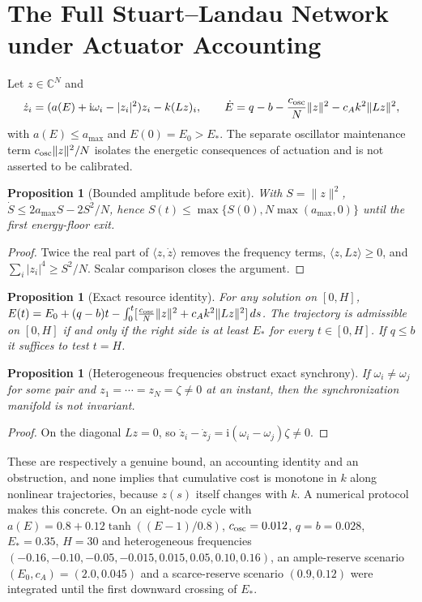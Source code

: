\documentclass[11pt,notitlepage]{report}
\newtheorem{proposition}[theorem]{Proposition}
\theoremstyle{definition}
\theoremstyle{remark}
\newcommand{\C}{\mathbb C}
\newcommand{\ii}{\mathrm i}
\begin{document}
\section{The Full Stuart--Landau Network under Actuator Accounting}
Let $z\in\C^N$ and
\begin{equation}\label{eq:SLact}
\dot z_i=(a(E)+\ii\omega_i-|z_i|^2)z_i-k(Lz)_i,\qquad
\dot E=q-b-\frac{c_{\rm osc}}N\|z\|^2-c_Ak^2\|Lz\|^2,
\end{equation}
with $a(E)\le a_{\max}$ and $E(0)=E_0>E_*$. The separate oscillator maintenance term $c_{\rm osc}\|z\|^2/N$ isolates the energetic consequences of actuation and is not asserted to be calibrated.
\begin{proposition}[Bounded amplitude before exit]\label{prop:bound}
With $S=\|z\|^2$, $\dot S\le2a_{\max}S-2S^2/N$, hence $S(t)\le\max\{S(0),N\max(a_{\max},0)\}$ until the first energy-floor exit.
\end{proposition}
\begin{proof}
Twice the real part of $\langle z,\dot z\rangle$ removes the frequency terms, $\langle z,Lz\rangle\ge0$, and $\sum_i|z_i|^4\ge S^2/N$. Scalar comparison closes the argument.
\end{proof}
\begin{proposition}[Exact resource identity]\label{prop:resource}
For any solution on $[0,H]$,
$E(t)=E_0+(q-b)t-\int_0^t[\tfrac{c_{\rm osc}}N\|z\|^2+c_Ak^2\|Lz\|^2]\,ds$.
The trajectory is admissible on $[0,H]$ if and only if the right side is at least $E_*$ for every $t\in[0,H]$. If $q\le b$ it suffices to test $t=H$.
\end{proposition}
\begin{proposition}[Heterogeneous frequencies obstruct exact synchrony]\label{prop:hetero}
If $\omega_i\neq\omega_j$ for some pair and $z_1=\cdots=z_N=\zeta\ne0$ at an instant, then the synchronization manifold is not invariant.
\end{proposition}
\begin{proof}
On the diagonal $Lz=0$, so $\dot z_i-\dot z_j=\ii(\omega_i-\omega_j)\zeta\neq0$.
\end{proof}
These are respectively a genuine bound, an accounting identity and an obstruction, and none implies that cumulative cost is monotone in $k$ along nonlinear trajectories, because $z(s)$ itself changes with $k$. A numerical protocol makes this concrete. On an eight-node cycle with $a(E)=0.8+0.12\tanh((E-1)/0.8)$, $c_{\rm osc}=0.012$, $q=b=0.028$, $E_*=0.35$, $H=30$ and heterogeneous frequencies $(-0.16,-0.10,-0.05,-0.015,0.015,0.05,0.10,0.16)$, an ample-reserve scenario $(E_0,c_A)=(2.0,0.045)$ and a scarce-reserve scenario $(0.9,0.12)$ were integrated until the first downward crossing of $E_*$.
\end{document}
